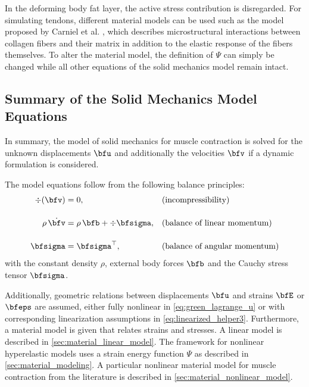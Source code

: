 In the deforming body fat layer, the active stress contribution is disregarded. For simulating tendons, different material models can be used such as the model proposed by Carniel et al. \cite{Carniel2017}, which describes microstructural interactions between collagen fibers and their matrix in addition to the elastic response of the fibers themselves. To alter the material model, the definition of $\Psi$ can simply be changed while all other equations of the solid mechanics model remain intact. 

\subsection{Summary of the Solid Mechanics Model Equations}
In summary, the model of solid mechanics for muscle contraction is solved for the unknown displacements $\bfu$ and additionally the velocities $\bfv$ if a dynamic formulation is considered.

The model equations follow from the following balance principles:
%
\begin{subequations}\label{eq:contraction}
  \begin{align}
    \div(\bfv) &= 0, \qquad &&\text{(incompressibility)} \label{eq:contraction_1}\\[4mm]
    \rho\,\dot{\bfv} &= \rho\,\bfb + \div\bfsigma, && \text{(balance of linear momentum)}\label{eq:contraction_2}\\[4mm]
    \bfsigma &= \bfsigma^\top, && \text{(balance of angular momentum)}\label{eq:contraction_3}
  \end{align}
\end{subequations}
with the constant density $\rho$, external body forces $\bfb$ and the Cauchy stress tensor $\bfsigma$.

Additionally, geometric relations between displacements $\bfu$ and strains $\bfE$ or $\bfeps$ are assumed, either fully nonlinear in \cref{eq:green_lagrange_u} or with corresponding linearization assumptions in \cref{eq:linearized_helper3}.
Furthermore, a material model is given that relates strains and stresses. A linear model is described in \cref{sec:material_linear_model}. The framework for nonlinear hyperelastic models uses a strain energy function $\Psi$ as described in \cref{sec:material_modeling}. A particular nonlinear material model for muscle contraction from the literature is described in \cref{sec:material_nonlinear_model}.

